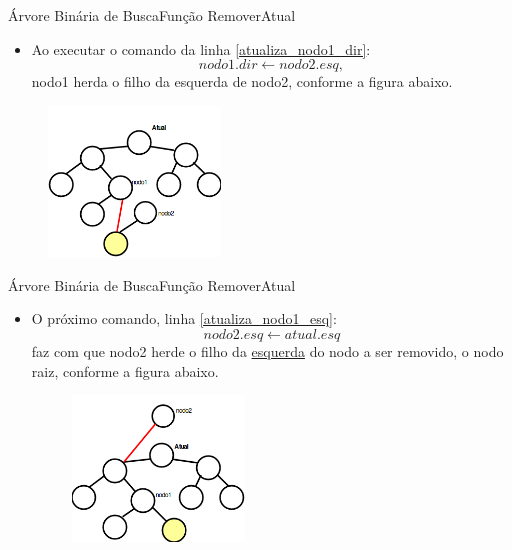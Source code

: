 \documentclass[aspectratio=169]{beamer}
\begin{document}

\begin{frame}{Árvore Binária de Busca}{Função RemoverAtual}

\begin{itemize}
\item Ao executar o comando da linha \ref{atualiza_nodo1_dir}:
\[
  nodo1.dir \leftarrow nodo2.esq,
\]
nodo1 herda o filho da esquerda de nodo2, conforme a figura abaixo.
\end{itemize}

\begin{figure}[!h]
  \centering
  \includegraphics[width=130pt]{imagens/remover_atual2.png}
  \label{fig_remover_atual2}
\end{figure}
\end{frame}


\begin{frame}{Árvore Binária de Busca}{Função RemoverAtual}
\begin{itemize}
\item O próximo comando, linha \ref{atualiza_nodo1_esq}:
\[
  nodo2.esq \leftarrow atual.esq
\]
faz com que nodo2 herde o filho da \underline{esquerda} do nodo a ser removido, o nodo raiz, conforme a figura abaixo.
\begin{figure}[!h]
  \centering
  \includegraphics[width=130pt]{imagens/remover_atual3.png}
  \label{fig_remover_atual3}
\end{figure}
\end{itemize}
\end{frame}

\end{document}
